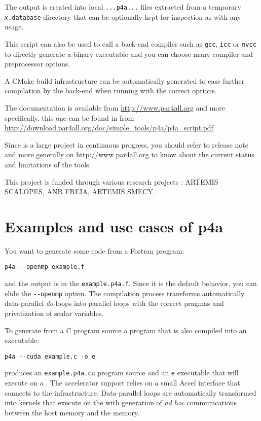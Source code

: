 \documentclass[a4paper]{article}
\begin{document}
The output is created into local \texttt{...p4a...} files extracted from a
temporary \texttt{\emph{x}.database} directory that can be optionally kept
for inspection as with any \Apips usage.

This script can also be used to call a back-end compiler such as
\texttt{gcc}, \texttt{icc} or \texttt{nvcc} to directly generate a binary
executable and you can choose many compiler and preprocessor options.

A CMake build infrastructure can be automatically generated to ease
further compilation by the back-end when running with the correct options.

The \Apfa documentation is available from \url{http://www.par4all.org} and
more specifically, this one can be found in \Apdf from
\url{http://download.par4all.org/doc/simple_tools/p4a/p4a_script.pdf}

Since \Apfa is a large project in continuous progress, you should refer to
release note and more generally on \url{http://www.par4all.org} to know
about the current status and limitations of the tools.

This project is funded through various research projects : ARTEMIS
SCALOPES, ANR FREIA, ARTEMIS SMECY.


\section{Examples and use cases of p4a}
\label{sec:examples}

You want to generate some \Aopenmp code from a Fortran program:
\begin{verbatim}
p4a --openmp example.f
\end{verbatim}
and the output is in the \texttt{example.p4a.f}. Since it is the default
behavior, you can elide the \verb/--openmp/ option. The compilation
process transforms automatically data-parallel \emph{do}-loops into
\Aopenmp parallel loops with the correct pragmas and privatization of
scalar variables.

To generate from a C program source a \Acuda program that is also compiled
into an executable:
\begin{verbatim}
p4a --cuda example.c -o e
\end{verbatim}
produces an \texttt{example.p4a.cu} \Acuda program source and an
\texttt{e} executable that will execute on a \Agpu. The \Agpu accelerator
support relies on a small \Apfa Accel interface that connects to the
\Acuda infrastructure. Data-parallel loops are automatically transformed
into \Acuda kernels that execute on the \Agpu with generation of \emph{ad
  hoc} communications between the host memory and the \Agpu memory.
\end{document}
